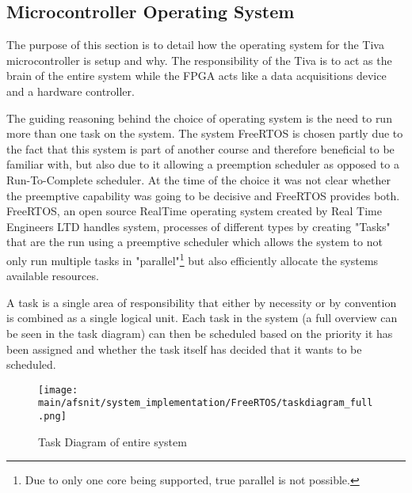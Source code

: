 \documentclass[../../../main]{subfiles}
\begin{document}
\subsection{Microcontroller Operating System}

The purpose of this section is to detail  how the operating system for the Tiva microcontroller is setup  and why. The responsibility of the Tiva is to act as the brain of the entire system while the FPGA acts like a data acquisitions device and a hardware controller.

The guiding  reasoning behind the choice of operating system is the need to run more than one task on the system. The system FreeRTOS is chosen partly due to the fact that this system  is part of another course and therefore beneficial to be familiar with, but also due to it allowing a preemption scheduler as opposed to a Run-To-Complete scheduler. At the time of the choice it was not clear whether the preemptive capability was going to be decisive and FreeRTOS provides both.
\\

FreeRTOS, an open source RealTime operating system created by Real Time Engineers LTD handles system, processes of different types by creating "Tasks" that are the run using a preemptive scheduler which allows the system to not only run multiple tasks in "parallel"\footnote{Due to only one core being supported, true parallel is not possible.}  but also efficiently allocate the systems available resources.


A task is a single area of responsibility that either by necessity or by convention is combined as a single logical unit. Each task in the system (a full overview can be seen in the task diagram) can then be scheduled based on the priority it has been assigned and whether the task itself has decided that it wants to be scheduled.

\begin{figure}[H]
\texttt{[image: \\main/afsnit/system\_implementation/FreeRTOS/taskdiagram\_full.png]}
\caption{Task Diagram of entire system}
\label{fig:entire_task_diagram}
\end{figure}
\end{document}

